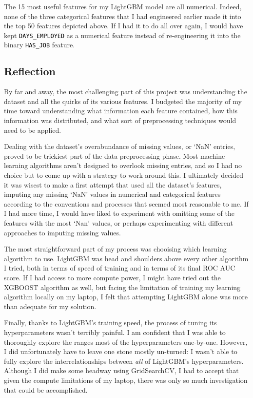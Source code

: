 \documentclass[12pt, letterpaper]{article}
\begin{document}
The 15 most useful features for my LightGBM model are all numerical. Indeed, none of the three categorical features that I had engineered earlier made it into the top 50 features depicted above. If I had it to do all over again, I would have kept \colorbox{backcolor}{\textcolor{black}{\texttt{DAYS_EMPLOYED}}} as a numerical feature instead of re-engineering it into the binary \colorbox{backcolor}{\textcolor{black}{\texttt{HAS_JOB}}} feature.

\subsection{Reflection}
By far and away, the most challenging part of this project was understanding the dataset and all the quirks of its various features. I budgeted the majority of my time toward understanding what information each feature contained, how this information was distributed, and what sort of preprocessing techniques would need to be applied.

Dealing with the dataset's overabundance of missing values, or `NaN' entries, proved to be trickiest part of the data preprocessing phase. Most machine learning algorithms aren't designed to overlook missing entries, and so I had no choice but to come up with a strategy to work around this. I ultimately decided it was wisest to make a first attempt that used all the dataset's features, imputing any missing `NaN' values in numerical and categorical features according to the conventions and processes that seemed most reasonable to me. If I had more time, I would have liked to experiment with omitting some of the features with the most `Nan' values, or perhaps experimenting with different approaches to imputing missing values.

The most straightforward part of my process was chooising which learning algorithm to use. LightGBM was head and shoulders above every other algorithm I tried, both in terms of speed of training and in terms of its final ROC AUC score. If I had access to more compute power, I might have tried out the XGBOOST algorithm as well, but facing the limitation of training my learning algorithm locally on my laptop, I felt that attempting LightGBM alone was more than adequate for my solution.

Finally, thanks to LightGBM's training speed, the process of tuning its hyperparameters wasn't terribly painful. I am confident that I was able to thoroughly explore the ranges most of the hyperparameters one-by-one. However, I did unfortunately have to leave one stone mostly un-turned: I wasn't able to fully explore the interrelationships between \textit{all} of LightGBM's hyperparameters. Although I did make some headway using GridSearchCV, I had to accept that given the compute limitations of my laptop, there was only so much investigation that could be accomplished.
\end{document}

